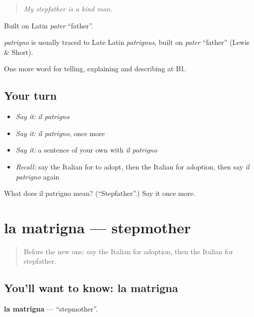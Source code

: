 \begin{quote}
\emph{My stepfather is a kind man.}
\end{quote}

Built on Latin \emph{pater} \textquotedblleft{}father\textquotedblright{}.

\begin{cousinweb}
\emph{patrigno} is usually traced to Late Latin \emph{patrignus}, built on \emph{pater} \textquotedblleft{}father\textquotedblright{} (Lewis \& Short).
\end{cousinweb}

\begin{grammarlens}[title={What you've built}]
One more word for telling, explaining and describing at B1.
\end{grammarlens}

\subsection*{Your turn}
\begin{itemize}
\raggedright
  \item \emph{Say it:} \emph{il patrigno}
  \item \emph{Say it:} \emph{il patrigno}, once more
  \item \emph{Say it:} a sentence of your own with \emph{il patrigno}
  \item \emph{Recall:} say the Italian for to adopt, then the Italian for adoption, then say \emph{il patrigno} again
\end{itemize}

\begin{tcolorbox}[breakable,colback=teal!4,colframe=teal!35!black,title={Before you move on}]
What does il patrigno mean? (\textquotedblleft{}Stepfather\textquotedblright{}.) Say it once more.
\end{tcolorbox}
\section[la matrigna]{la matrigna — stepmother}

\label{lesson:IT-C495-matrigna}



\begin{quote}
Before the new one: say the Italian for adoption, then the Italian for stepfather.
\end{quote}

\subsection*{You'll want to know: la matrigna}
\textbf{la matrigna} — \textquotedblleft{}stepmother\textquotedblright{}.

